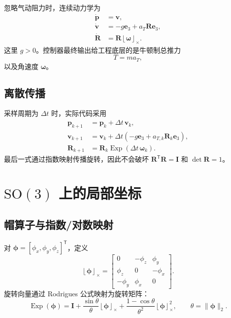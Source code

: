 \documentclass[UTF8,a4paper,11pt]{ctexart}
\newcommand{\SO}{\mathrm{SO}(3)}
\newcommand{\Exp}{\operatorname{Exp}}
\newcommand{\skewmat}[1]{\left\lfloor #1\right\rfloor_\times}
\begin{document}
忽略气动阻力时，连续动力学为
\begin{align}
  \dot{\bm p} &= \bm v, \\
  \dot{\bm v} &= -g\bm e_3+a_T\bm R\bm e_3, \\
  \dot{\bm R} &= \bm R\skewmat{\bm\omega}.
  \label{eq:continuous_model}
\end{align}
这里 $g>0$。控制器最终输出给工程底层的是牛顿制总推力
\begin{equation}
  T=m a_T,
  \label{eq:thrust_conversion}
\end{equation}
以及角速度 $\bm\omega$。

\subsection{离散传播}

采样周期为 $\Delta t$ 时，实际代码采用
\begin{align}
  \bm p_{k+1} &= \bm p_k+\Delta t\,\bm v_k,\\
  \bm v_{k+1} &= \bm v_k+\Delta t
  \left(-g\bm e_3+a_{T,k}\bm R_k\bm e_3\right),\\
  \bm R_{k+1} &= \bm R_k\Exp(\Delta t\,\bm\omega_k).
  \label{eq:discrete_model}
\end{align}
最后一式通过指数映射传播旋转，因此不会破坏
$\bm R^\mathsf T\bm R=\bm I$ 和 $\det\bm R=1$。

\section{$\SO$ 上的局部坐标}

\subsection{帽算子与指数/对数映射}

对 $\bm\phi=[\phi_x,\phi_y,\phi_z]^\mathsf T$，定义
\begin{equation}
  \skewmat{\bm\phi}=
  \begin{bmatrix}
    0&-\phi_z&\phi_y\\
    \phi_z&0&-\phi_x\\
    -\phi_y&\phi_x&0
  \end{bmatrix}.
\end{equation}
旋转向量通过 Rodrigues 公式映射为旋转矩阵：
\begin{equation}
  \Exp(\bm\phi)=
  \bm I+\frac{\sin\theta}{\theta}\skewmat{\bm\phi}
  +\frac{1-\cos\theta}{\theta^2}\skewmat{\bm\phi}^{2},
  \qquad \theta=\lVert\bm\phi\rVert_2.
\end{equation}
\end{document}
